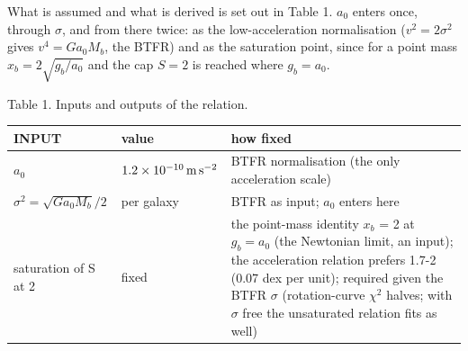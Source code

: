 \documentclass[
  10pt,
]{article}
\begin{document}
What is assumed and what is derived is set out in Table 1. $a_0$ enters
once, through $\sigma$, and from there twice: as the low-acceleration
normalisation ($v^2=2\sigma^2$ gives $v^4=G a_0 M_b$, the BTFR)
and as the saturation point, since for a point mass $x_b=2\sqrt{g_b/a_0}$ and the cap $S=2$ is reached where $g_b=a_0$.

Table 1. Inputs and outputs of the relation.

\begin{longtable}[]{@{}lll@{}}
\toprule
\begin{minipage}[b]{0.24\columnwidth}\raggedright
INPUT\strut
\end{minipage} & \begin{minipage}[b]{0.20\columnwidth}\raggedright
value\strut
\end{minipage} & \begin{minipage}[b]{0.50\columnwidth}\raggedright
how fixed\strut
\end{minipage}\tabularnewline
\midrule
\endhead
\begin{minipage}[t]{0.24\columnwidth}\raggedright
$a_0$\strut
\end{minipage} & \begin{minipage}[t]{0.20\columnwidth}\raggedright
$1.2\times10^{-10}\,{\rm m\,s^{-2}}$\strut
\end{minipage} & \begin{minipage}[t]{0.50\columnwidth}\raggedright
BTFR normalisation (the only acceleration scale)\strut
\end{minipage}\tabularnewline
\begin{minipage}[t]{0.24\columnwidth}\raggedright
$\sigma^2=\sqrt{G a_0 M_b}/2$\strut
\end{minipage} & \begin{minipage}[t]{0.20\columnwidth}\raggedright
per galaxy\strut
\end{minipage} & \begin{minipage}[t]{0.50\columnwidth}\raggedright
BTFR as input; $a_0$ enters here\strut
\end{minipage}\tabularnewline
\begin{minipage}[t]{0.24\columnwidth}\raggedright
saturation of S at 2\strut
\end{minipage} & \begin{minipage}[t]{0.20\columnwidth}\raggedright
fixed\strut
\end{minipage} & \begin{minipage}[t]{0.50\columnwidth}\raggedright
the point-mass identity $x_b$ = 2 at $g_b=a_0$ (the Newtonian limit, an input); the acceleration relation prefers 1.7-2 (0.07 dex per unit); required given the BTFR $\sigma$ (rotation-curve $\chi^2$ halves; with $\sigma$ free the unsaturated relation fits as well)\strut

\end{minipage}
\end{longtable}
\end{document}
